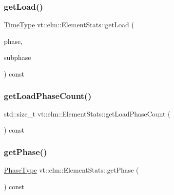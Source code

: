 \mbox{\label{structvt_1_1elm_1_1_element_stats_ab0480c6cfdcf936df7c780de3a58f2c0}} 
\subsubsection{\texorpdfstring{get\+Load()}{getLoad()}\hspace{0.1cm}{\footnotesize\ttfamily [2/2]}}
{\footnotesize\ttfamily \hyperlink{namespacevt_a876a9d0cd5a952859c72de8a46881442}{Time\+Type} vt\+::elm\+::\+Element\+Stats\+::get\+Load (\begin{DoxyParamCaption}\item[{\hyperlink{namespacevt_a46ce6733d5cdbd735d561b7b4029f6d7}{Phase\+Type}}]{phase,  }\item[{\hyperlink{namespacevt_ae78cbfdf1e57470e33eedb074f2beeba}{Subphase\+Type}}]{subphase }\end{DoxyParamCaption}) const}

\mbox{\label{structvt_1_1elm_1_1_element_stats_a0578b01b6a0f7aee29ad57676ee9073b}} 
\subsubsection{\texorpdfstring{get\+Load\+Phase\+Count()}{getLoadPhaseCount()}}
{\footnotesize\ttfamily std\+::size\+\_\+t vt\+::elm\+::\+Element\+Stats\+::get\+Load\+Phase\+Count (\begin{DoxyParamCaption}{ }\end{DoxyParamCaption}) const}

\mbox{\label{structvt_1_1elm_1_1_element_stats_a92dc6fcc45664696a7a9a12089b035cd}} 
\subsubsection{\texorpdfstring{get\+Phase()}{getPhase()}}
{\footnotesize\ttfamily \hyperlink{namespacevt_a46ce6733d5cdbd735d561b7b4029f6d7}{Phase\+Type} vt\+::elm\+::\+Element\+Stats\+::get\+Phase (\begin{DoxyParamCaption}{ }\end{DoxyParamCaption}) const}

